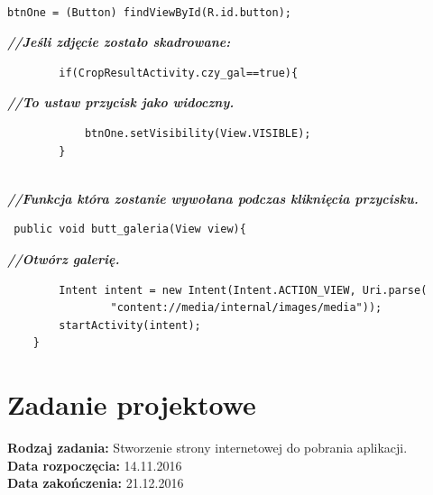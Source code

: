 \begin{verbatim}

btnOne = (Button) findViewById(R.id.button);\end{verbatim}
                                                                                               \textit{\textbf{//Jeśli zdjęcie zostało skadrowane:}}
                                                                                                 \begin{verbatim}
        if(CropResultActivity.czy_gal==true){\end{verbatim}
                                                                                                       \textit{\textbf{//To ustaw przycisk jako widoczny.}}
                                                                                                         \begin{verbatim}
            btnOne.setVisibility(View.VISIBLE);
        }
        
        \end{verbatim}
                                                                                                       \textit{\textbf{//Funkcja która zostanie wywołana podczas kliknięcia przycisku.}}
                                                                                                         \begin{verbatim}
 public void butt_galeria(View view){\end{verbatim}
                                                                                                \textit{\textbf{//Otwórz galerię.}}
                                                                                                  \begin{verbatim}
        Intent intent = new Intent(Intent.ACTION_VIEW, Uri.parse(
                "content://media/internal/images/media"));
        startActivity(intent);
    }
\end{verbatim}

\section{Zadanie projektowe}
\noindent\textbf{Rodzaj zadania:}   Stworzenie strony internetowej do pobrania aplikacji. \\

\noindent\textbf{Data rozpoczęcia:} 14.11.2016\\

\noindent\textbf{Data zakończenia:} 21.12.2016\\

